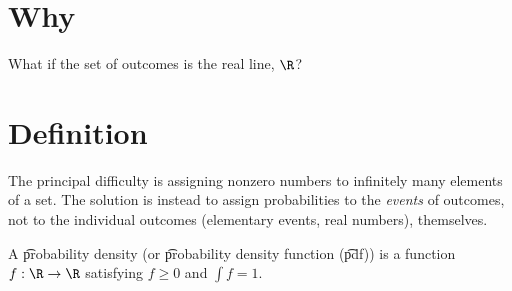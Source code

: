 

\section*{Why}

What if the set of outcomes is the real line, $\R $?

\section*{Definition}

The principal difficulty is assigning nonzero numbers to infinitely many elements of a set.
The solution is instead to assign probabilities to the \textit{events} of outcomes, not to the individual outcomes (elementary events, real numbers), themselves.

A \t{probability density} (or \t{probability density function} (\t{pdf})) is a function $f: \R  \to \R  $ satisfying $f \geq 0$ and $\int  f = 1$.

\blankpage